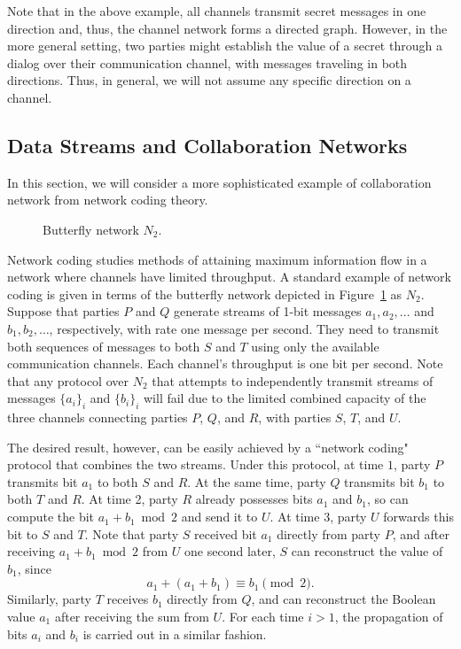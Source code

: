 \documentclass{llncs}
\begin{document}
Note that in the above example, all channels transmit secret messages in one direction and, thus, the channel network forms a directed graph. However, in the more general setting, two parties might establish the value of a secret through a dialog over their communication channel, with messages traveling in both directions. Thus, in general, we will not assume any specific direction on a channel.



  





\subsection{Data Streams and Collaboration Networks}
In this section, we will consider a more sophisticated example of collaboration network from network coding theory.

\begin{figure}[htbp]
   \centering
   \caption{Butterfly network $N_2$.}
   \label{butterfly_graph}
\end{figure}


Network coding studies methods of attaining maximum information flow in a network where channels have limited throughput. 
A standard example of network coding is given in terms of the butterfly network \cite{acly00} depicted in Figure~\ref{butterfly_graph} as $N_2$. Suppose that parties $P$ and $Q$ generate streams of 1-bit messages $a_1,a_2,\dots$ and $b_1,b_2,\dots$, respectively, with rate one message per second. They need to transmit both sequences of messages to both $S$ and $T$ using only the available communication channels. Each channel's throughput is one bit per second. Note that any protocol over $N_2$ that attempts to independently transmit streams of messages $\{a_i\}_i$ and $\{b_i\}_i$ will fail due to the limited combined capacity of the three channels connecting parties $P$, $Q$, and $R$, with parties $S$, $T$, and $U$.  



The desired result, however, can be easily achieved by a ``network coding" protocol that combines the two streams. 
Under this protocol, at time $1$, party $P$ transmits bit $a_1$ to both $S$ and $R$. At the same time, party $Q$ transmits bit $b_1$ to both $T$ and $R$. At time 2, party $R$ already possesses bits $a_{1}$ and $b_{1}$, so can compute the bit $a_{1} + b_{1} \bmod 2$ and send it to $U$. At time 3, party $U$ forwards this bit to $S$ and $T$. Note that party $S$ received bit $a_1$ directly from party $P$, and after receiving $a_1+b_1 \bmod 2$ from $U$ one second later, $S$ can reconstruct the value of $b_1$, since 
$$a_1+ (a_1+b_1)  \equiv b_1 \pmod 2.$$ Similarly, party $T$ receives $b_1$ directly from $Q$, and can reconstruct the Boolean value $a_1$ after receiving the sum from $U$.  For each time $i>1$, the propagation of bits $a_i$ and $b_i$ is carried out in a similar fashion.
\end{document}
